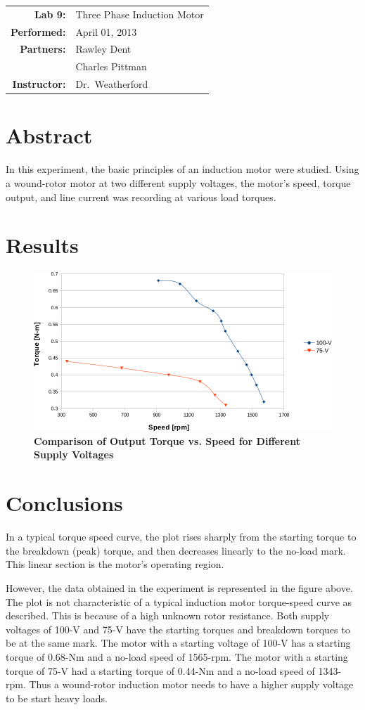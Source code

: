 \documentclass{article}
\begin{document}
\begin{tabular}{rl}
	\textbf{Lab 9:} & Three Phase Induction Motor\\
	\textbf{Performed:} & April 01, 2013 \\
	\textbf{Partners:} & Rawley Dent \\ & Charles Pittman \\
	\textbf{Instructor:} & Dr.\ Weatherford
\end{tabular}


\section*{Abstract}
	In this experiment, the basic principles of an induction motor were studied.
	Using a wound-rotor motor at two different supply voltages, the motor's
	speed, torque output, and line current was recording at various load torques.

\section*{Results}
	\begin{figure}[H]
		\centering
		\includegraphics[width=1.0\textwidth]{img/graph}
		\caption{\textbf{Comparison of Output Torque vs. Speed for Different Supply Voltages}}
		\label{fig:graph}
	\end{figure}

\section*{Conclusions}
	In a typical torque speed curve, the plot rises sharply from the starting
	torque to the breakdown (peak) torque, and then decreases linearly to the
	no-load mark. This linear section is the motor's operating region.

	However, the data obtained in the experiment is represented in the figure
	above. The plot is not characteristic of a typical induction motor
	torque-speed curve as described.  This is because of a high unknown rotor
	resistance. Both supply voltages of 100-V and 75-V have the starting torques
	and breakdown torques to be at the same mark. The motor with a starting
	voltage of 100-V has a starting torque of 0.68-Nm and a no-load speed of
	1565-rpm.  The motor with a starting torque of 75-V had a starting torque of
	0.44-Nm and a no-load speed of 1343-rpm. Thus a wound-rotor induction motor
	needs to have a higher supply voltage to be start heavy loads.
\end{document}
